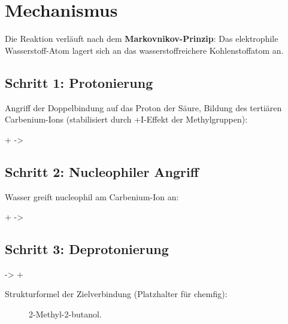 \section{Mechanismus}
\label{sec:mechanismus}

Die Reaktion verläuft nach dem \textbf{Markovnikov-Prinzip}: Das
elektrophile Wasserstoff-Atom lagert sich an das wasserstoffreichere
Kohlenstoffatom an.

\subsection{Schritt 1: Protonierung}
Angriff der Doppelbindung auf das Proton der Säure, Bildung des
tertiären Carbenium-Ions (stabilisiert durch +I-Effekt der
Methylgruppen):
\begin{reaction}
   +  -> 
\end{reaction}

\subsection{Schritt 2: Nucleophiler Angriff}
Wasser greift nucleophil am Carbenium-Ion an:
\begin{reaction}
   +  -> 
\end{reaction}

\subsection{Schritt 3: Deprotonierung}
\begin{reaction}
   ->  + 
\end{reaction}

Strukturformel der Zielverbindung (Platzhalter für chemfig):
\begin{figure}[H]
  \centering
  \caption{2-Methyl-2-butanol.}
  \label{fig:chemfig}
\end{figure}
